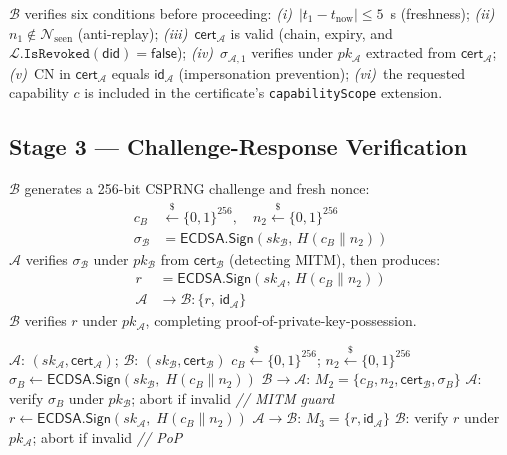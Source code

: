 \documentclass[review,5p,twocolumn,times]{elsarticle}
\begin{document}
$\mathcal{B}$ verifies six conditions before proceeding:
\emph{(i)}~$|t_1 - t_{\mathrm{now}}| \leq 5$~s (freshness);
\emph{(ii)}~$n_1 \notin \mathcal{N}_{\mathrm{seen}}$ (anti-replay);
\emph{(iii)}~$\mathsf{cert}_\mathcal{A}$ is valid (chain, expiry, and
$\mathcal{L}.\mathtt{IsRevoked}(\mathsf{did}) = \mathsf{false}$);
\emph{(iv)}~$\sigma_{\mathcal{A},1}$ verifies under $pk_\mathcal{A}$
extracted from $\mathsf{cert}_\mathcal{A}$;
\emph{(v)}~CN in $\mathsf{cert}_\mathcal{A}$ equals $\mathsf{id}_\mathcal{A}$
(impersonation prevention);
\emph{(vi)}~the requested capability $c$ is included in the certificate's
\texttt{capabilityScope} extension.

\subsection{Stage 3 --- Challenge-Response Verification}

$\mathcal{B}$ generates a 256-bit CSPRNG challenge and fresh nonce:
\begin{align}
c_B &\xleftarrow{\$} \{0,1\}^{256},\quad n_2 \xleftarrow{\$} \{0,1\}^{256} \nonumber\\
\sigma_\mathcal{B} &= \mathsf{ECDSA.Sign}(sk_\mathcal{B},\, H(c_B \| n_2))
\label{eq:challenge}
\end{align}
$\mathcal{A}$ verifies $\sigma_\mathcal{B}$ under $pk_\mathcal{B}$ from
$\mathsf{cert}_\mathcal{B}$ (detecting MITM), then produces:
\begin{align}
r &= \mathsf{ECDSA.Sign}(sk_\mathcal{A},\, H(c_B \| n_2)) \nonumber\\
\mathcal{A} &\to \mathcal{B} : \{r,\, \mathsf{id}_\mathcal{A}\}
\label{eq:response}
\end{align}
$\mathcal{B}$ verifies $r$ under $pk_\mathcal{A}$,
completing proof-of-private-key-possession.

\begin{algorithm}[H]
\caption{Challenge-Response Verification (Stage 3)}
\label{alg:cr}
\begin{algorithmic}[1]
\Require $\mathcal{A}$: $(sk_\mathcal{A}, \mathsf{cert}_\mathcal{A})$;
         $\mathcal{B}$: $(sk_\mathcal{B}, \mathsf{cert}_\mathcal{B})$
\State $c_B \xleftarrow{\$} \{0,1\}^{256}$;\quad
       $n_2 \xleftarrow{\$} \{0,1\}^{256}$
\State $\sigma_B \leftarrow \mathsf{ECDSA.Sign}(sk_\mathcal{B},\; H(c_B\|n_2))$
\State $\mathcal{B} \to \mathcal{A}$: $M_2 = \{c_B, n_2, \mathsf{cert}_\mathcal{B}, \sigma_B\}$
\State $\mathcal{A}$: verify $\sigma_B$ under $pk_\mathcal{B}$; abort if invalid
  \hfill\textit{// MITM guard}
\State $r \leftarrow \mathsf{ECDSA.Sign}(sk_\mathcal{A},\; H(c_B\|n_2))$
\State $\mathcal{A} \to \mathcal{B}$: $M_3 = \{r, \mathsf{id}_\mathcal{A}\}$
\State $\mathcal{B}$: verify $r$ under $pk_\mathcal{A}$; abort if invalid
  \hfill\textit{// PoP}
\end{algorithmic}
\end{algorithm}
\end{document}
